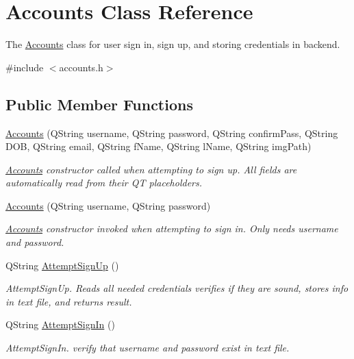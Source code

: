 \hypertarget{classAccounts}{}\section{Accounts Class Reference}
\label{classAccounts}


The \hyperlink{classAccounts}{Accounts} class for user sign in, sign up, and storing credentials in backend.  




{\ttfamily \#include $<$accounts.\+h$>$}

\subsection*{Public Member Functions}
\begin{DoxyCompactItemize}
\item 
\hyperlink{classAccounts_ad1526db68d755eeac36773b25ce2fb5c}{Accounts} (Q\+String username, Q\+String password, Q\+String confirm\+Pass, Q\+String D\+OB, Q\+String email, Q\+String f\+Name, Q\+String l\+Name, Q\+String img\+Path)
\begin{DoxyCompactList}\small\item\em \hyperlink{classAccounts}{Accounts} constructor called when attempting to sign up. All fields are automatically read from their QT placeholders. \end{DoxyCompactList}\item 
\hyperlink{classAccounts_a8ed6f0ed9cc9921eab9861c24c8c1150}{Accounts} (Q\+String username, Q\+String password)
\begin{DoxyCompactList}\small\item\em \hyperlink{classAccounts}{Accounts} constructor invoked when attempting to sign in. Only needs username and password. \end{DoxyCompactList}\item 
Q\+String \hyperlink{classAccounts_a726265a4bb4639f6f8cb95bd17e22b36}{Attempt\+Sign\+Up} ()
\begin{DoxyCompactList}\small\item\em Attempt\+Sign\+Up. Reads all needed credentials verifies if they are sound, stores info in text file, and returns result. \end{DoxyCompactList}\item 
Q\+String \hyperlink{classAccounts_a94aa6f557c36a7ca958780cfeacdec83}{Attempt\+Sign\+In} ()
\begin{DoxyCompactList}\small\item\em Attempt\+Sign\+In. verify that username and password exist in text file. \end{DoxyCompactList}\item 

\end{DoxyCompactItemize}
